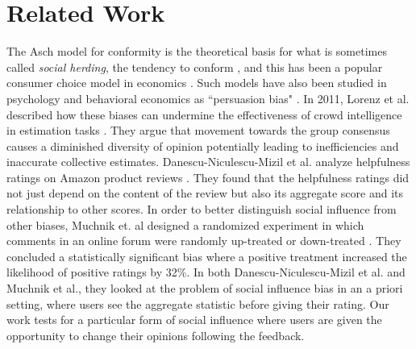 \section{Related Work}



The Asch model for conformity is the theoretical basis for what is sometimes called \emph{social herding}, the tendency to conform \cite{banerjee1992simple,bikhchandani2000herd}, and this has been a popular consumer choice model in economics \cite{burnkrant1975informational,dholakia2002auction,huang2006herding}. 
Such models have also been studied in psychology and behavioral economics as ``persuasion bias" \cite{demarzo2003persuasion, hong2004social, golub2010naive, dellavigna2009persuasion}.
In 2011, Lorenz et al. described how these biases can undermine the effectiveness of crowd intelligence in estimation tasks \cite{lorenz2011social}. 
They argue that movement towards the group consensus causes a diminished diversity of opinion potentially leading to inefficiencies and inaccurate collective estimates.
Danescu-Niculescu-Mizil et al. analyze helpfulness ratings on Amazon product reviews \cite{danescu2009opinions}.
They found that the helpfulness ratings did not just depend on the content of the review but also its aggregate score and its relationship to other scores.
In order to better distinguish social influence from other biases, Muchnik et. al designed a randomized experiment in which comments in an online forum were randomly up-treated or down-treated \cite{muchnik2013social}.
They concluded a statistically significant bias where a positive treatment increased the likelihood of positive ratings by 32\%. 
In both Danescu-Niculescu-Mizil et al. and Muchnik et al., they looked at the problem of social influence bias in an a priori setting, where users see the aggregate statistic before giving their rating.
Our work tests for a particular form of social influence where users are given the opportunity to change their opinions following the feedback. 

